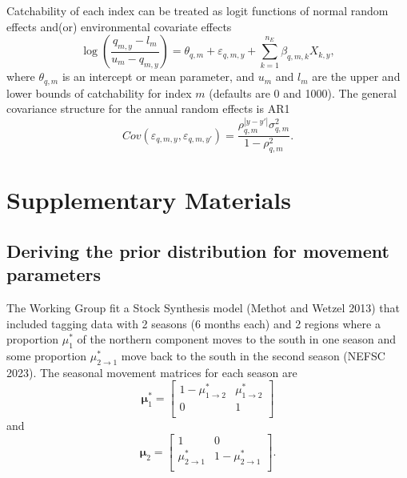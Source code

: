 \documentclass[
]{article}
\begin{document}
Catchability of each index can be treated as logit functions of normal random effects and(or) environmental covariate effects
\begin{equation*}
\log \left(\frac{q_{m,y}-l_m}{u_m-q_{m,y}}\right) = \theta_{q,m} + \varepsilon_{q,m,y}  + \sum^{n_E}_{k=1} \beta_{q,m,k} X_{k,y},
\end{equation*}
where \(\theta_{q,m}\) is an intercept or mean parameter, and \(u_{m}\) and \(l_{m}\) are the upper and lower bounds of catchability for index \(m\) (defaults are 0 and 1000). The general covariance structure for the annual random effects is AR1
\begin{equation*}
Cov\left(\varepsilon_{q,m,y},\varepsilon_{q,m,y'}\right) =   \frac{\rho_{q,m}^{|y-y'|}\sigma^2_{q,m}}{1 - \rho_{q,m}^2}.
\end{equation*}

\pagebreak

\hypertarget{supplementary-materials}{%
\section*{Supplementary Materials}\label{supplementary-materials}}

\hypertarget{deriving-the-prior-distribution-for-movement-parameters}{%
\subsection*{Deriving the prior distribution for movement parameters}\label{deriving-the-prior-distribution-for-movement-parameters}}

The Working Group fit a Stock Synthesis model (Methot and Wetzel 2013) that included tagging data with 2 seasons (6 months each) and 2 regions where a proportion \(\mu^*_1\) of the northern component moves to the south in one season and some proportion \(\mu^*_{2\rightarrow 1}\) move back to the south in the second season (NEFSC 2023). The seasonal movement matrices for each season are
\begin{equation*}
\boldsymbol{\mu}^*_{1} = 
  \begin{bmatrix}
     1-\mu^*_{1\rightarrow 2} & \mu^*_{1\rightarrow 2} \\
     0 & 1 \\
  \end{bmatrix}
\end{equation*}
and
\begin{equation*}
\boldsymbol{\mu}_{2} = 
  \begin{bmatrix}
     1 &  0 \\
     \mu^*_{2\rightarrow 1} & 1-\mu^*_{2\rightarrow 1} \\
  \end{bmatrix}.
\end{equation*}
\end{document}
